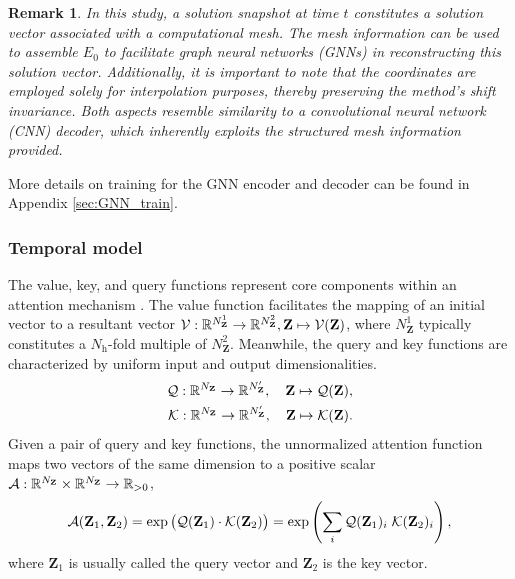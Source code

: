 \documentclass{article}
\newtheorem{remark}{Remark}
\begin{document}
\begin{remark}
In this study, a solution snapshot at time $t$ constitutes a solution vector associated with a computational mesh. The mesh information can be used to assemble $E_0$ to facilitate graph neural networks (GNNs) in reconstructing this solution vector. Additionally, it is important to note that the coordinates are employed solely for interpolation purposes, thereby preserving the method's shift invariance. Both aspects resemble similarity to a convolutional neural network (CNN) decoder, which inherently exploits the structured mesh information provided.
\end{remark}

More details on training for the GNN encoder and decoder can be found in Appendix \ref{sec:GNN_train}.


\subsubsection{Temporal model}
\label{sec:temp_model}
The value, key, and query functions represent core components within an attention mechanism \cite{vaswani2017attention}. The value function facilitates the mapping of an initial vector to a resultant vector $\mathcal{V}:\mathbb{R}^{N^1_\mathbf{Z}}\rightarrow\mathbb{R}^{N^2_\mathbf{Z}}, \mathbf{Z}\mapsto \mathcal{V}(\mathbf{Z})$, where $N^1_\mathbf{Z}$ typically constitutes a $N_\mathrm{h}$-fold multiple of $N^2_\mathbf{Z}$. Meanwhile, the query and key functions are characterized by uniform input and output dimensionalities. 
\begin{equation}
\begin{split}
\mathcal{Q}:\mathbb{R}^{N_\mathbf{Z}}\rightarrow \mathbb{R}^{N_\mathbf{Z}'},\quad \mathbf{Z}\mapsto \mathcal{Q}(\mathbf{Z}),\\
\mathcal{K}:\mathbb{R}^{N_\mathbf{Z}}\rightarrow \mathbb{R}^{N_\mathbf{Z}'},\quad \mathbf{Z}\mapsto \mathcal{K}(\mathbf{Z}).
\end{split}
\end{equation}
Given a pair of query and key functions, the unnormalized attention function maps two vectors of the same dimension to a positive scalar $\mathcal{A}:\mathbb{R}^{N_{\mathbf{Z}}}\times\mathbb{R}^{N_{\mathbf{Z}}}\rightarrow\mathbb{R}_{>0}$,
    \begin{equation}
        \mathcal{A}(\mathbf{Z}_1,\mathbf{Z}_2)=\exp\big(\mathcal{Q}(\mathbf{Z}_1)\cdot \mathcal{K}(\mathbf{Z}_2)\big)= \exp \left( \sum_{i} \mathcal{Q}(\mathbf{Z}_1)_i \;\mathcal{K}(\mathbf{Z}_2)_i\right),
    \end{equation}
    where $\mathbf{Z}_1$ is usually called the query vector and $\mathbf{Z}_2$ is the key vector. 
\end{document}
